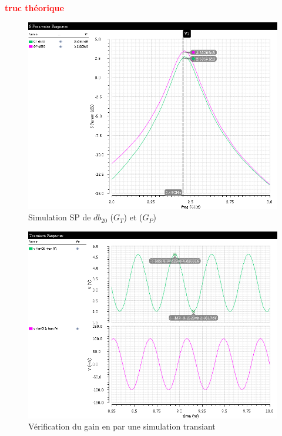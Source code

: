 \documentclass[a4paper]{article}
\begin{document}
\textbf{\textcolor{red}{truc th\'eorique}}

\begin{figure}[!htb]
\begin{center}
  \includegraphics[scale=0.45]{Q4-GT-GP-db20.png}
  \caption{Simulation SP de $db_{20}$ ($G_T$) et ($G_P$) }
  \label{sim-GT-GP}
\end{center}
\end{figure}

\clearpage

\begin{figure}[!htb]
\begin{center}
  \includegraphics[scale=0.45]{Q4-Gv-tran.png}
  \caption{V\'erification du gain en par une simulation transiant}
  \label{sim-transiant-gv}
\end{center}
\end{figure}
\end{document}
